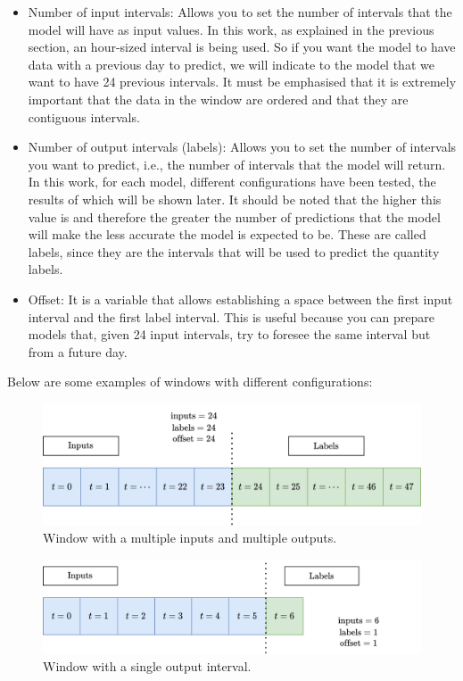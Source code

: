 \begin{itemize}
    
    \item Number of input intervals: Allows you to set the number of intervals that the model will have as input values. In this work, as explained in the previous section, an hour-sized interval is being used. So if you want the model to have data with a previous day to predict, we will indicate to the model that we want to have 24 previous intervals. It must be emphasised that it is extremely important that the data in the window are ordered and that they are contiguous intervals.
    
    \item Number of output intervals (labels): Allows you to set the number of intervals you want to predict, i.e., the number of intervals that the model will return. In this work, for each model, different configurations have been tested, the results of which will be shown later. It should be noted that the higher this value is and therefore the greater the number of predictions that the model will make the less accurate the model is expected to be. These are called labels, since they are the intervals that will be used to predict the quantity labels.
    
    \item Offset: It is a variable that allows establishing a space between the first input interval and the first label interval. This is useful because you can prepare models that, given 24 input intervals, try to foresee the same interval but from a future day.
\end{itemize}

Below are some examples of windows with different configurations:

\begin{figure}[H]
    \centering
    \includegraphics[width=12cm]{images/solution/modules/windows/windows-1.png}
    \caption{Window with a multiple inputs and multiple outputs.}
\end{figure}


\begin{figure}[H]
    \centering
    \includegraphics[width=12cm]{images/solution/modules/windows/windows-2.png}
    \caption{Window with a single output interval.}
\end{figure}



